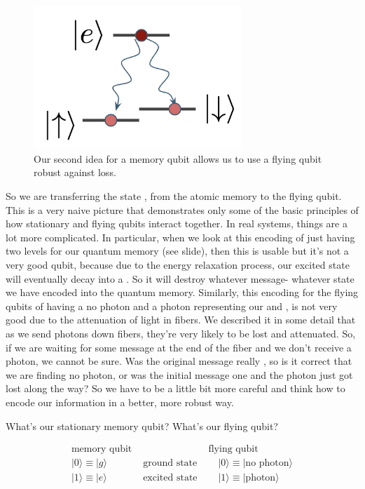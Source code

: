 \begin{figure}[t]
    \centering
    \includegraphics[width=0.7\textwidth]{lesson13/memory-second-idea.png}
    \caption[Our second idea for memory]{Our second idea for a memory qubit allows us to use a flying qubit robust against loss.}
    \label{fig:13-memory-second-idea}
\end{figure}

So we are transferring the state \ket{+}, from the atomic memory to the flying qubit. This is a very naive picture that demonstrates only some of the basic principles of how stationary and flying qubits interact together. In real systems, things are a lot more complicated. In particular, when we look at this encoding of just having two levels for our quantum memory (see slide), then this is usable but it's not a very good qubit, because due to the energy relaxation process, our excited state will eventually decay into a . So it will destroy whatever message- whatever state we have encoded into the quantum memory. Similarly, this encoding for the flying qubits of having a no photon and a photon representing our  and , is not very good due to the attenuation of light in fibers. We described it in some detail that as we send photons down fibers, they're very likely to be lost and attenuated. So, if we are waiting for some message at the end of the fiber and we don't receive a photon, we cannot be sure. Was the original message really , so is it correct that we are finding no photon, or was the initial message one and the photon just got lost along the way? So we have to be a little bit more careful and think how to encode our information in a better, more robust way.

What's our stationary memory qubit? What's our flying qubit?

\begin{equation}
\begin{array}{lll}
\text{memory qubit} & & \text{flying qubit} \\

|0\rangle \equiv|g\rangle \quad & \text { ground state } & \quad|0\rangle \equiv \mid \text {no photon}\rangle \\
|1\rangle \equiv|e\rangle \quad & \text { excited state } & \quad|1\rangle \equiv \mid \text {photon}\rangle \\
\end{array}
\end{equation}

